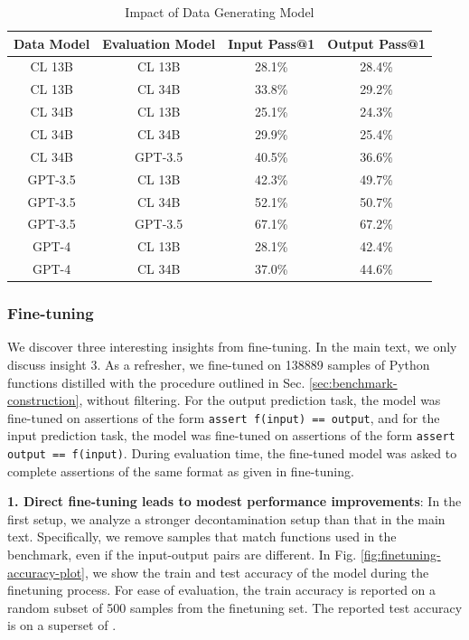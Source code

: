 \begin{table}[H]
    \centering
    \caption{Impact of Data Generating Model}
    \begin{tabular}{cccc}
        \toprule
        \textbf{Data Model} & \textbf{Evaluation Model} & \textbf{Input Pass@1} & \textbf{Output Pass@1} \\
        \midrule
        CL 13B & CL 13B & 28.1\% & 28.4\% \\
        CL 13B & CL 34B & 33.8\% & 29.2\% \\
        \midrule
        CL 34B & CL 13B & 25.1\% & 24.3\% \\
        CL 34B & CL 34B & 29.9\% & 25.4\% \\
        CL 34B & GPT-3.5 & 40.5\% & 36.6\% \\
        \midrule
        GPT-3.5 & CL 13B & 42.3\% & 49.7\% \\
        GPT-3.5 & CL 34B & 52.1\% & 50.7\% \\
        GPT-3.5 & GPT-3.5 & 67.1\% & 67.2\% \\
        \midrule
        GPT-4 & CL 13B & 28.1\% & 42.4\% \\
        GPT-4 & CL 34B & 37.0\% & 44.6\% \\
        \bottomrule
    \end{tabular}
    \label{tab:benchmark-results-data-generating}
\end{table}

\subsubsection{Fine-tuning} \label{subsec:appendix-finetuning}
We discover three interesting insights from fine-tuning. In the main text, we only discuss insight 3. As a refresher, we fine-tuned \codellamalarge on 138889 samples of Python functions distilled with the procedure outlined in Sec. \ref{sec:benchmark-construction}, without filtering. For the output prediction task, the model was fine-tuned on assertions of the form \texttt{assert f(input) == output}, and for the input prediction task, the model was fine-tuned on assertions of the form \texttt{assert output == f(input)}. During evaluation time, the fine-tuned model was asked to complete assertions of the same format as given in fine-tuning. 

\textbf{1. Direct fine-tuning leads to modest performance improvements}: In the first setup, we analyze a stronger decontamination setup than that in the main text. Specifically, we remove samples that match functions used in the benchmark, even if the input-output pairs are different. In Fig. \ref{fig:finetuning-accuracy-plot}, we show the train and test accuracy of the model during the finetuning process. For ease of evaluation, the train accuracy is reported on a random subset of 500 samples from the finetuning set. The reported test accuracy is on a superset of \benchmark. 

